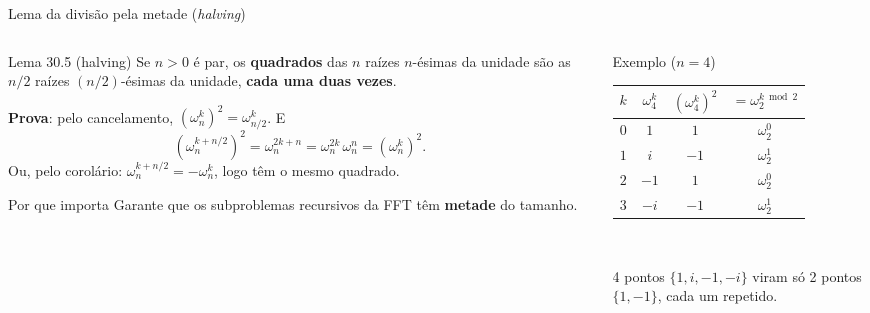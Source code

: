 \documentclass[aspectratio=169,10pt]{beamer}
\newcommand{\w}[2][n]{\omega_{#1}^{#2}}       %
\begin{document}
\begin{frame}{Lema da divisão pela metade (\textit{halving})}
  \begin{columns}[T]
    \begin{column}{0.52\textwidth}
      \begin{block}{Lema 30.5 (halving)}
        Se $n>0$ é par, os \textbf{quadrados} das $n$ raízes $n$-ésimas da unidade são
        as $n/2$ raízes $(n/2)$-ésimas da unidade, \textbf{cada uma duas vezes}.
      \end{block}
      \textbf{Prova}: pelo cancelamento, $(\w{k})^2 = \w[n/2]{k}$. E
      \[
        (\w{k+n/2})^2 = \w{2k+n} = \w{2k}\,\w{n} = (\w{k})^2.
      \]
      Ou, pelo corolário: $\w{k+n/2} = -\w{k}$, logo têm o mesmo quadrado.
      \begin{alertblock}{Por que importa}
        \small Garante que os subproblemas recursivos da FFT têm \textbf{metade} do tamanho.
      \end{alertblock}
    \end{column}
    \begin{column}{0.44\textwidth}
      \begin{exampleblock}{Exemplo ($n=4$)}
        \centering
        \begin{tabular}{cccc}
          \toprule
          $k$ & $\w[4]{k}$ & $(\w[4]{k})^2$ & $=\w[2]{k \bmod 2}$ \\
          \midrule
          $0$ & $1$  & $1$  & $\w[2]{0}$ \\
          $1$ & $i$  & $-1$ & $\w[2]{1}$ \\
          $2$ & $-1$ & $1$  & $\w[2]{0}$ \\
          $3$ & $-i$ & $-1$ & $\w[2]{1}$ \\
          \bottomrule
        \end{tabular}\\[4pt]
        \raggedright
        4 pontos $\{1,i,-1,-i\}$ viram só 2 pontos $\{1,-1\}$, cada um repetido.
      \end{exampleblock}
    \end{column}
  \end{columns}
\end{frame}
\end{document}
